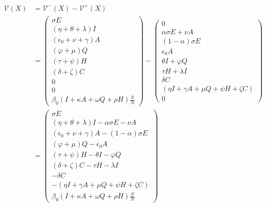 \documentclass[authoryear,preprint]{elsarticle}
\begin{document}
\begin{equation}
\begin{split}
\mathcal{V}(X) &= \mathcal{V}^{-}(X) - \mathcal{V}^{+}(X)\\
&= \begin{pmatrix}
\sigma E \\
\left( \eta + \theta + \lambda \right) I\\
\left( \epsilon_0 + \nu + \gamma \right) A\\
\left( \varphi + \mu \right) Q\\
\left( \tau + \psi \right) H\\
\left( \delta + \zeta \right) C\\
0\\
0\\
\beta_0 \left( I + \kappa A + \omega Q + \rho H \right) \frac{S}{N}
\end{pmatrix} - 
\begin{pmatrix}
0 \\
\alpha \sigma E + \nu A\\
\left( 1 - \alpha \right)\sigma E  \\
\epsilon_0 A\\
\theta I + \varphi Q\\
\tau H + \lambda I\\
\delta C\\
\left( \eta I +  \gamma A + \mu Q + \psi H + \zeta C \right)\\
0
\end{pmatrix}\\
&= \begin{pmatrix}
\sigma E \\
\left( \eta + \theta + \lambda \right) I - \alpha \sigma E - \nu A\\
\left( \epsilon_0 + \nu + \gamma \right) A - \left( 1 - \alpha \right)\sigma E\\
\left( \varphi + \mu \right) Q - \epsilon_0 A\\
\left( \tau + \psi \right) H - \theta I - \varphi Q\\
\left( \delta + \zeta \right) C - \tau H - \lambda I\\
-\delta C\\
-\left( \eta I +  \gamma A + \mu Q + \psi H + \zeta C \right)\\
\beta_0 \left( I + \kappa A + \omega Q + \rho H \right) \frac{S}{N}
\end{pmatrix}
\end{split}
\label{eqn:baseline-compact-3}
\end{equation}
\end{document}
